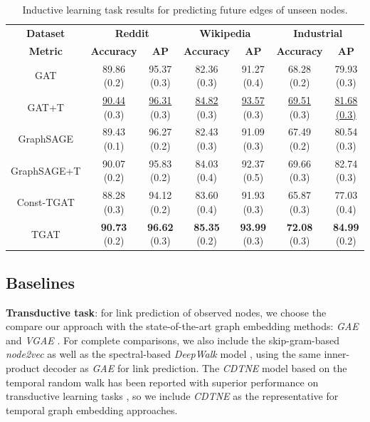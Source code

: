 \documentclass{article} %
\begin{document}
\begin{table}[]
\footnotesize
    \centering
    \begin{tabular}{c|c c |c c |c c }
    \hline
    \hline
         \textbf{Dataset} & \multicolumn{2}{c}{\textbf{Reddit}} & \multicolumn{2}{c}{\textbf{Wikipedia}} & \multicolumn{2}{c}{\textbf{Industrial}} \\ 
        
        \textbf{Metric} & \textbf{Accuracy} & \textbf{AP} &  \textbf{Accuracy} & \textbf{AP} &  \textbf{Accuracy} & \textbf{AP} \\
        
        \hline
        GAT & {89.86} (0.2) & {95.37} (0.3) & 82.36 (0.3) & 91.27 (0.4) & {68.28} (0.2) & {79.93} (0.3) \\ 
        {GAT+T} &  \underline{90.44} (0.3)   & \underline{96.31} (0.3)  &  \underline {84.82} (0.3) &  \underline{93.57} (0.3) & \underline{69.51} (0.3)  & \underline{81.68 (0.3)}  \\
        GraphSAGE & 89.43 (0.1) & 96.27 (0.2) & {82.43} (0.3) & {91.09} (0.3) & 67.49 (0.2) & 80.54 (0.3) \\ 
        {GraphSAGE+T} & 90.07 (0.2)   & 95.83 (0.2)  & {84.03} (0.4) & {92.37} (0.5)  & 69.66 (0.3)  & 82.74 (0.3)  \\\hline
        Const-TGAT & 88.28 (0.3) & 94.12 (0.2) & 83.60 (0.4) & 91.93 (0.3) & 65.87 (0.3) & 77.03 (0.4) \\
        TGAT & \textbf{90.73} (0.2) & \textbf{96.62} (0.3) & \textbf{85.35} (0.2) & \textbf{93.99} (0.3) & \textbf{72.08} (0.3) & \textbf{84.99} (0.2) \\ 
        \hline
        \hline
    \end{tabular}
    \caption{Inductive learning task results for predicting future edges of unseen nodes.}
    \label{tab:new_node_edge_pred}
\end{table}



\subsection{Baselines}
\label{sec:baseline}
\textbf{Transductive task}: for link prediction of observed nodes, we choose the compare our approach with the state-of-the-art graph embedding methods: \textsl{GAE} and \textsl{VGAE} \citep{kipf2016variational}. For complete comparisons, we also include the skip-gram-based \textsl{node2vec} \citep{grover2016node2vec} as well as the spectral-based \textsl{DeepWalk} model \citep{perozzi2014deepwalk}, using the same inner-product decoder as \textsl{GAE} for link prediction. The \textsl{CDTNE} model based on the temporal random walk has been reported with superior performance on transductive learning tasks \citep{nguyen2018continuous}, so we include \textsl{CDTNE} as the representative for temporal graph embedding approaches.
\end{document}
